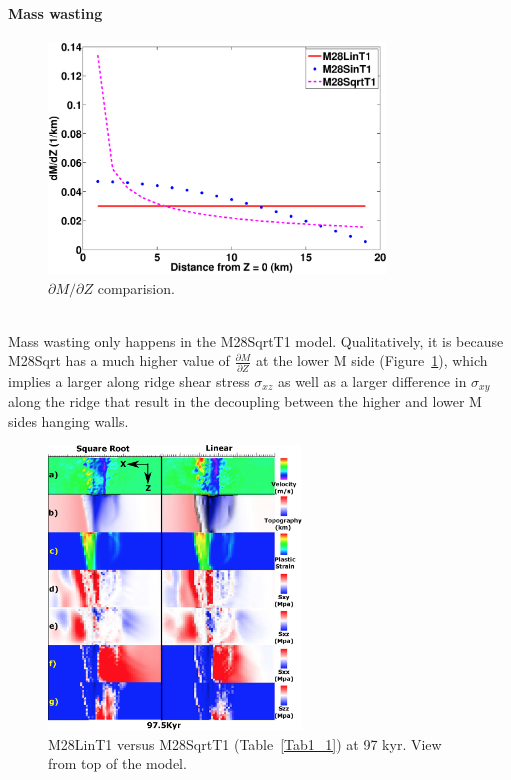 \paragraph{Mass wasting}

\begin{figure}[h]
  \centering
    \includegraphics[width=0.8\textwidth]{./Figures/fig_Results_3_3_1_M_type_plot_dM_dZ.eps}
  \caption{$\partial M/ \partial Z$ comparision.}
 \label{fig_Results_3_3_1_M_type_plot_dM_dZ}
\end{figure}  

~\\
Mass wasting only happens in the M28SqrtT1 model. Qualitatively, it is because M28Sqrt has a much higher value of $\frac{\partial M}{\partial Z}$ at the lower M side (Figure~\hyperref[fig_Results_3_3_1_M_type_plot_dM_dZ]{\ref{fig_Results_3_3_1_M_type_plot_dM_dZ}}), which implies a larger along ridge shear stress $\sigma_{xz}$ as well as a larger difference in $\sigma_{xy}$ along the ridge that result in the decoupling between the higher and lower M sides hanging walls. 

\iffalse
\begin{figure}[h]
  \centering
    \includegraphics[width=0.6\textwidth]{./Figures/fig_Results4_3_sqrt_vs_lin_cut_back_97kyr.eps}
  \caption{M28LinT1 versus M28SqrtT1 (Table~\hyperref[Tab1_1]{\ref{Tab1_1}}) at 97 kyr. View from top of the model.}
 \label{fig_Results4_3_1}
\end{figure}  

